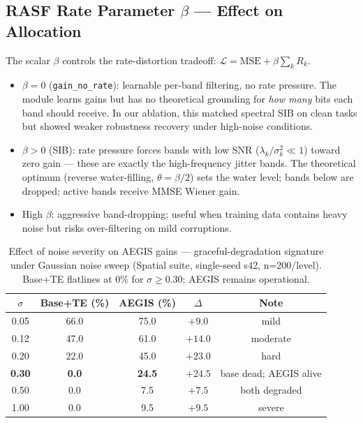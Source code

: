 \documentclass[11pt,a4paper]{article}
\newcommand{\win}[1]{{\color{frozengreen}\textbf{#1}}}
\newcommand{\good}[1]{{\color{aegisblue}#1}}
\begin{document}
\subsection{RASF Rate Parameter $\beta$ — Effect on Allocation}
\label{sec:beta}

The scalar $\beta$ controls the rate-distortion tradeoff: $\mathcal{L}=\mathrm{MSE}+\beta\sum_k R_k$.
\begin{itemize}[nosep]
  \item $\beta=0$ (\texttt{gain\_no\_rate}): learnable per-band filtering, no rate pressure.
        The module learns gains but has no theoretical grounding for \emph{how many} bits
        each band should receive. In our ablation, this matched spectral SIB on clean tasks
        but showed weaker robustness recovery under high-noise conditions.
  \item $\beta>0$ (SIB): rate pressure forces bands with low SNR ($\lambda_k/\sigma_k^2 \ll 1$)
        toward zero gain — these are exactly the high-frequency jitter bands. The theoretical
        optimum (reverse water-filling, $\theta=\beta/2$) sets the water level; bands below
        are dropped; active bands receive MMSE Wiener gain.
  \item High $\beta$: aggressive band-dropping; useful when training data contains heavy noise
        but risks over-filtering on mild corruptions.
\end{itemize}

\begin{table}[H]
\centering
\caption{Effect of noise severity on AEGIS gains — graceful-degradation signature under
Gaussian noise sweep (Spatial suite, single-seed s42, n=200/level). Base+TE flatlines at 0\%
for $\sigma \geq 0.30$; AEGIS remains operational.}
\label{tab:noise_sweep}
\small
\begin{tabular}{ccccc}
\toprule
$\sigma$ & Base+TE (\%) & AEGIS (\%) & $\Delta$ & Note \\
\midrule
0.05 & 66.0 & \good{75.0} & $+9.0$ & mild \\
0.12 & 47.0 & \good{61.0} & $+14.0$ & moderate \\
0.20 & 22.0 & \good{45.0} & $+23.0$ & hard \\
\textbf{0.30} & \textbf{0.0} & \win{\textbf{24.5}} & $+24.5$ & base dead; AEGIS alive \\
0.50 & 0.0 & 7.5 & $+7.5$ & both degraded \\
1.00 & 0.0 & 9.5 & $+9.5$ & severe \\
\bottomrule
\end{tabular}
\end{table}
\end{document}
